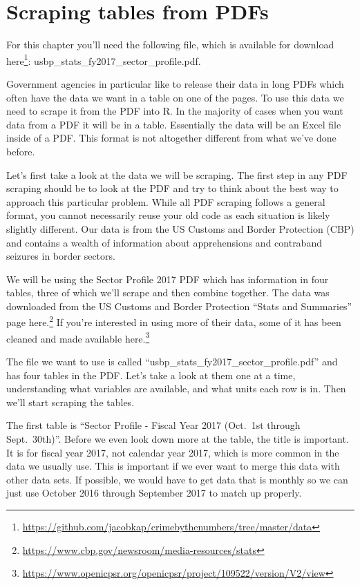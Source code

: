 \documentclass[
]{krantz}
\renewcommand{\href}[2]{#2\footnote{\url{#1}}}
\begin{document}
\hypertarget{scrape-table}{%
\chapter{Scraping tables from PDFs}\label{scrape-table}}

For this chapter you'll need the following file, which is
available for download
\href{https://github.com/jacobkap/crimebythenumbers/tree/master/data}{here}:
usbp\_stats\_fy2017\_sector\_profile.pdf.

Government agencies in particular like to release their data
in long PDFs which often have the data we want in a table on
one of the pages. To use this data we need to scrape it from
the PDF into R. In the majority of cases when you want data
from a PDF it will be in a table. Essentially the data will
be an Excel file inside of a PDF. This format is not
altogether different from what we've done before.

Let's first take a look at the data we will be scraping. The
first step in any PDF scraping should be to look at the PDF
and try to think about the best way to approach this
particular problem. While all PDF scraping follows a general
format, you cannot necessarily reuse your old code as each
situation is likely slightly different. Our data is from the
US Customs and Border Protection (CBP) and contains a wealth
of information about apprehensions and contraband seizures
in border sectors.

We will be using the Sector Profile 2017 PDF which has
information in four tables, three of which we'll scrape and
then combine together. The data was downloaded from the US
Customs and Border Protection ``Stats and Summaries'' page
\href{https://www.cbp.gov/newsroom/media-resources/stats}{here.}
If you're interested in using more of their data, some of it
has been cleaned and made available
\href{https://www.openicpsr.org/openicpsr/project/109522/version/V2/view}{here.}

The file we want to use is called
``usbp\_stats\_fy2017\_sector\_profile.pdf'' and has four
tables in the PDF. Let's take a look at them one at a time,
understanding what variables are available, and what units
each row is in. Then we'll start scraping the tables.

The first table is ``Sector Profile - Fiscal Year 2017
(Oct.~1st through Sept.~30th)''. Before we even look down
more at the table, the title is important. It is for fiscal
year 2017, not calendar year 2017, which is more common in
the data we usually use. This is important if we ever want
to merge this data with other data sets. If possible, we
would have to get data that is monthly so we can just use
October 2016 through September 2017 to match up properly.
\end{document}
